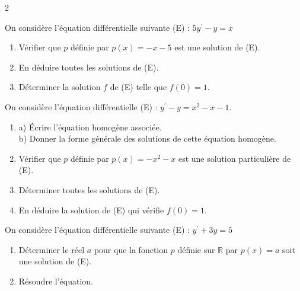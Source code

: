 \begin{multicols}{2}
		\begin{exercice_cours}[\quad]{}

			On considère l'équation différentielle suivante (E) : $5 y^{\prime}-y=x$

\begin{enumerate}
  \item Vérifier que $p$ définie par $p(x)=-x-5$ est une solution de (E).
  \item En déduire toutes les solutions de (E).
  \item Déterminer la solution $f$ de (E) telle que $f(0)=1$.
\end{enumerate}


		\end{exercice_cours}

		\begin{exercice_cours}[\quad]{}

			On considère l'équation différentielle (E) : $y^{\prime}-y=x^{2}-x-1$.

\begin{enumerate}
  \item a) Écrire l'équation homogène associée.\\
b) Donner la forme générale des solutions de cette équation homogène.
  \item Vérifier que $p$ définie par $p(x)=-x^{2}-x$ est une solution particulière de (E).
  \item Déterminer toutes les solutions de (E).
  \item En déduire la solution de (E) qui vérifie $f(0)=1$.
\end{enumerate}


		\end{exercice_cours}

		\begin{exercice_cours}[\quad]{}

			On considère l'équation différentielle suivante (E) : $y^{\prime}+3 y=5$

\begin{enumerate}
  \item Déterminer le réel $a$ pour que la fonction $p$ définie sur $\mathbb{R}$ par $p(x)=a$ soit une solution de (E).
  \item Résoudre l'équation.
\end{enumerate}


		\end{exercice_cours}

		\begin{exercice_cours}[\quad]{}


\end{exercice_cours}
\end{multicols}
